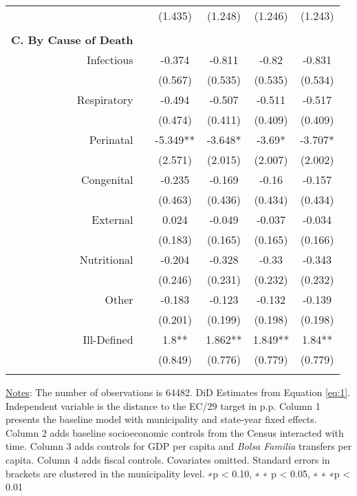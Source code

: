 \begin{table}[h!]
\begin{footnotesize}
\begin{center}
{\begin{threeparttable}[b]
\begin{tabular}{rrcccc}
          &       & (1.435) & (1.248) & (1.246) & (1.243) \\
          &       &       &       &       &  \\
    \midrule
    \multicolumn{1}{p{15.145em}}{\textbf{C. By Cause of Death}} &       &       &       &       &  \\
    \multicolumn{1}{p{15.145em}}{Infectious} &       & -0.374 & -0.811 & -0.82 & -0.831 \\
          &       & (0.567) & (0.535) & (0.535) & (0.534) \\
    \multicolumn{1}{p{15.145em}}{Respiratory} &       & -0.494 & -0.507 & -0.511 & -0.517 \\
          &       & (0.474) & (0.411) & (0.409) & (0.409) \\
    \multicolumn{1}{p{15.145em}}{Perinatal} &       & -5.349** & -3.648* & -3.69* & -3.707* \\
          &       & (2.571) & (2.015) & (2.007) & (2.002) \\
    \multicolumn{1}{p{15.145em}}{Congenital} &       & -0.235 & -0.169 & -0.16 & -0.157 \\
          &       & (0.463) & (0.436) & (0.434) & (0.434) \\
    \multicolumn{1}{p{15.145em}}{External} &       & 0.024 & -0.049 & -0.037 & -0.034 \\
          &       & (0.183) & (0.165) & (0.165) & (0.166) \\
    \multicolumn{1}{p{15.145em}}{Nutritional} &       & -0.204 & -0.328 & -0.33 & -0.343 \\
          &       & (0.246) & (0.231) & (0.232) & (0.232) \\
    \multicolumn{1}{p{15.145em}}{Other} &       & -0.183 & -0.123 & -0.132 & -0.139 \\
          &       & (0.201) & (0.199) & (0.198) & (0.198) \\
    \multicolumn{1}{p{15.145em}}{Ill-Defined} &       & 1.8** & 1.862** & 1.849** & 1.84** \\
          &       & (0.849) & (0.776) & (0.779) & (0.779) \\
          &       &       &       &       &  \\
    \bottomrule
    \bottomrule
    \end{tabular}%
    
    
    \begin{tablenotes}
  \scriptsize{\underline{Notes}: The number of observations is 64482. DiD Estimates from Equation \ref{eq:1}. Independent variable is the distance to the EC/29 target in p.p. Column 1 presents the baseline model with municipality and state-year fixed effects. Column 2 adds baseline socioeconomic controls from the Census interacted with time. Column 3 adds controls for GDP per capita and \emph{Bolsa Familia} transfers per capita. Column 4 adds fiscal controls. Covariates omitted. Standard errors in brackets are clustered in the municipality level. ∗p < 0.10, ∗ ∗ p < 0.05, ∗ ∗ ∗p < 0.01}
  \end{tablenotes}
    

\end{threeparttable}}
\end{center}
\end{footnotesize}
\end{table}
